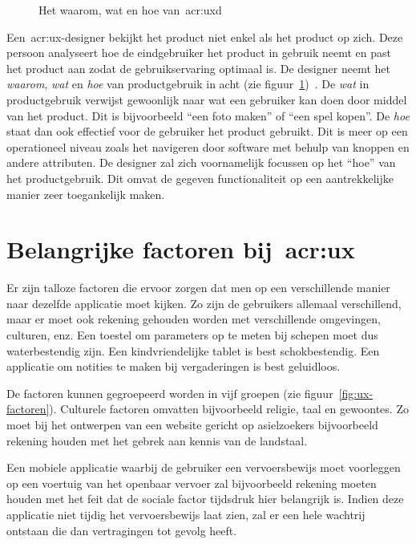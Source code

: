 \begin{figure}[h]
    \centering
    \def\svgwidth{.8\columnwidth}
    
    \caption{Het waarom, wat en hoe van~\acrlong{acr:uxd}}
    \label{fig:ux-waarom-wat-hoe}
\end{figure}

Een~\acrshort{acr:ux}-designer bekijkt het product niet enkel als het product op zich. Deze persoon analyseert hoe de eindgebruiker het product in gebruik neemt en past het product aan zodat de gebruikservaring optimaal is. De designer neemt het \textit{waarom}, \textit{wat} en \textit{hoe} van productgebruik in acht (zie figuur~\ref{fig:ux-waarom-wat-hoe})~\autocite{Hassenzahl2013}. De \textit{wat} in productgebruik verwijst gewoonlijk naar wat een gebruiker kan doen door middel van het product. Dit is bijvoorbeeld ``een foto maken'' of ``een spel kopen''. De \textit{hoe} staat dan ook effectief voor de gebruiker het product gebruikt. Dit is meer op een operationeel niveau zoals het navigeren door software met behulp van knoppen en andere attributen. De designer zal zich voornamelijk focussen op het ``hoe'' van het productgebruik. Dit omvat de gegeven functionaliteit op een aantrekkelijke manier zeer toegankelijk maken.

\section{Belangrijke factoren bij~\acrlong{acr:ux}}
\label{sec:belangrijke-factoren-bij-user-experience}

Er zijn talloze factoren die ervoor zorgen dat men op een verschillende manier naar dezelfde applicatie moet kijken. Zo zijn de gebruikers allemaal verschillend, maar er moet ook rekening gehouden worden met verschillende omgevingen, culturen, enz. Een toestel om parameters op te meten bij schepen moet dus waterbestendig zijn. Een kindvriendelijke tablet is best schokbestendig. Een applicatie om notities te maken bij vergaderingen is best geluidloos.

De factoren kunnen gegroepeerd worden in vijf groepen (zie figuur~\ref{fig:ux-factoren}). Culturele factoren omvatten bijvoorbeeld religie, taal en gewoontes. Zo moet bij het ontwerpen van een website gericht op asielzoekers bijvoorbeeld rekening houden met het gebrek aan kennis van de landstaal.

Een mobiele applicatie waarbij de gebruiker een vervoersbewijs moet voorleggen op een voertuig van het openbaar vervoer zal bijvoorbeeld rekening moeten houden met het feit dat de sociale factor tijdsdruk hier belangrijk is. Indien deze applicatie niet tijdig het vervoersbewijs laat zien, zal er een hele wachtrij ontstaan die dan vertragingen tot gevolg heeft.

